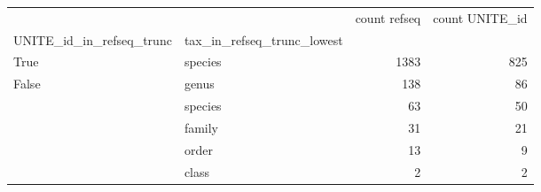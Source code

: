 \begin{tabular}{llrr}
\toprule
 &  & count refseq & count UNITE\_id \\
UNITE_id_in_refseq_trunc & tax_in_refseq_trunc_lowest &  &  \\
\midrule
True & species & 1383 & 825 \\
\cline{1-4}
\multirow[t]{5}{*}{False} & genus & 138 & 86 \\
 & species & 63 & 50 \\
 & family & 31 & 21 \\
 & order & 13 & 9 \\
 & class & 2 & 2 \\
\cline{1-4}
\bottomrule
\end{tabular}
